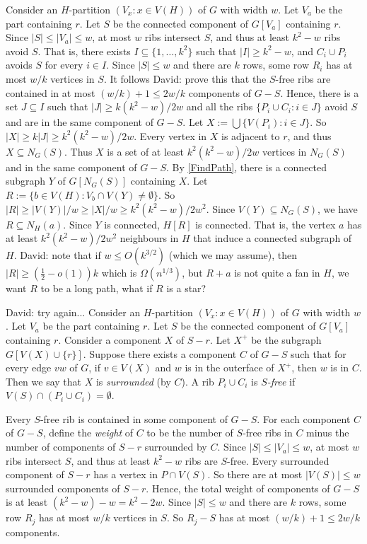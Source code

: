 \documentclass{patmorin}
\renewcommand{\geq}{\geqslant}
\renewcommand{\leq}{\leqslant}
\newcommand{\david}[1]{{\color{orange} David: #1}}
\newcommand{\defin}[1]{\emph{\textcolor{brightmaroon}{#1}}}
\begin{document}
Consider an $H$-partition $(V_x:x\in V(H))$ of $G$ with width $w$. Let $V_a$ be the part containing $r$. Let $S$ be the connected component of $G[V_a]$ containing $r$. Since $|S|\leq |V_a|\leq w$, at most $w$ ribs intersect $S$, and thus at least $k^2-w$ ribs avoid $S$. That is, there exists $I\subseteq \{1,\dots,k^2\}$ such that $|I|\geq k^2-w$, and $C_i\cup P_i$ avoids $S$ for every $i\in I$. Since $|S|\leq w$ and there are $k$ rows, some row $R_i$ has at most $w/k$ vertices in $S$. It follows \david{prove this} that the $S$-free ribs are contained in at most $(w/k)+1 \leq 2w/k$ components of $G-S$. Hence, there is a set $J\subseteq I$ such that $|J|\geq k(k^2-w)/2w$ and all the ribs $\{P_i\cup C_i:i\in J\}$ avoid $S$ and are in the same component of $G-S$. Let $X:=\bigcup\{V(P_i):i\in J\}$. So $|X|\geq k|J|\geq k^2(k^2-w)/2w$. Every vertex in $X$ is adjacent to $r$, and thus $X\subseteq N_G(S)$. Thus $X$ is a set of at least $k^2(k^2-w)/2w$ vertices in $N_G(S)$ and in the same component of $G-S$. By \cref{FindPath}, there is a connected subgraph $Y$ of $G[N_G(S)]$ containing $X$. Let $R:=\{ b\in V(H): V_b\cap V(Y)\neq\emptyset\}$. So $|R|\geq |V(Y)|/w\geq |X|/w \geq k^2(k^2-w)/2w^2$. Since $V(Y)\subseteq N_G(S)$, we have $R\subseteq N_H(a)$. Since $Y$ is connected, $H[R]$ is connected. That is, the vertex $a$ has at least $k^2(k^2-w)/2w^2$ neighbours in $H$ that induce a connected subgraph of $H$.
\david{note that if $w\leq O(k^{3/2})$ (which we may assume), then $|R|\geq (\frac12 -o(1))k$ which is $\Omega(n^{1/3})$, but $R+a$ is not quite a fan in $H$, we want $R$ to be a long path, what if $R$ is a star? }



\david{try again...}
Consider an $H$-partition $(V_x:x\in V(H))$ of $G$ with width $w$. Let $V_a$ be the part containing $r$. Let $S$ be the connected component of $G[V_a]$ containing $r$.
Consider a component $X$ of $S-r$. Let $X^+$ be the subgraph $G[V(X)\cup\{r\}]$. Suppose there exists a component $C$ of $G-S$ such that for every edge $vw$ of $G$, if $v\in V(X)$ and $w$ is in the outerface of $X^+$, then $w$ is in $C$. Then we say that $X$ is \defin{surrounded} (by $C$). A rib $P_i\cup C_i$ is \defin{$S$-free} if $V(S)\cap (P_i\cup C_i)=\emptyset$.

Every $S$-free rib is contained in some component of $G-S$.
For each component $C$ of $G-S$, define the \defin{weight} of $C$ to be the number of $S$-free ribs in $C$ minus the number of components of $S-r$ surrounded by $C$. Since $|S|\leq |V_a|\leq w$, at most $w$ ribs intersect $S$, and thus at least $k^2-w$ ribs are $S$-free. Every surrounded component of $S-r$ has a vertex in $P\cap V(S)$. So there are at most $|V(S)|\leq w$ surrounded components of $S-r$. Hence, the total weight of components of $G-S$ is at least $(k^2-w)-w=k^2-2w$. Since $|S|\leq w$ and there are $k$ rows, some row $R_j$ has at most $w/k$ vertices in $S$. So $R_j-S$ has at most $(w/k)+1\leq 2w/k$ components.
\end{document}
